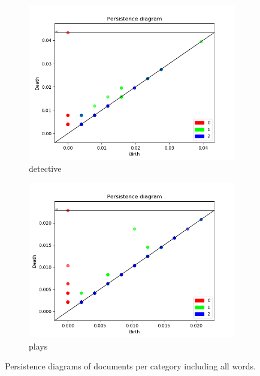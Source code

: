 \documentclass[fleqn]{article}
\begin{document}
\begin{figure}
\begin{subfigure}[t]{0.425\textwidth}
			\includegraphics[width=\textwidth]{figures/all_words/detective.png}
			\caption{detective}
			\label{fig:all:detective}
		\end{subfigure}\hfill
		\begin{subfigure}[t]{0.425\textwidth}
			\includegraphics[width=\textwidth]{figures/all_words/plays.png}
			\caption{plays}
			\label{fig:all:plays}
		\end{subfigure}\hfill
		\caption{Persistence diagrams of documents per category including all words.}
		\label{fig:all}
	\end{figure}
	
\end{document}
